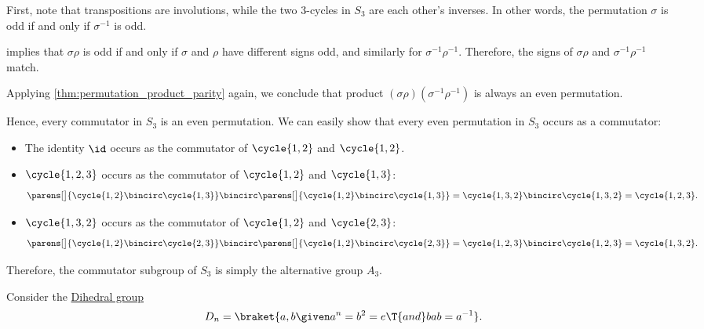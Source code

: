 \begin{example}
\begin{thmenum}
    First, note that transpositions are involutions, while the two \( 3 \)-cycles in \( S_3 \) are each other's inverses. In other words, the permutation \( \sigma \) is odd if and only if \( \sigma^{-1} \) is odd.

     implies that \( \sigma \rho \) is odd if and only if \( \sigma \) and \( \rho \) have different signs odd, and similarly for \( \sigma^{-1} \rho^{-1} \). Therefore, the signs of \( \sigma \rho \) and \( \sigma^{-1} \rho^{-1} \) match.

    Applying \cref{thm:permutation_product_parity} again, we conclude that product \( (\sigma \rho) (\sigma^{-1} \rho^{-1}) \) is always an even permutation.

    Hence, every commutator in \( S_3 \) is an even permutation. We can easily show that every even permutation in \( S_3 \) occurs as a commutator:
    \begin{itemize}
      \item The identity \( \id \) occurs as the commutator of \( \cycle{ 1, 2 } \) and \( \cycle{ 1, 2 } \).
      \item \( \cycle{ 1, 2, 3 } \) occurs as the commutator of \( \cycle{ 1, 2 } \) and \( \cycle{ 1, 3 } \):
      \begin{equation*}
        \parens[\big]{ \cycle{ 1, 2 } \bincirc \cycle{ 1, 3 } } \bincirc \parens[\big]{ \cycle{ 1, 2 } \bincirc \cycle{ 1, 3 } }
        =
        \cycle{ 1, 3, 2 } \bincirc \cycle{ 1, 3, 2 }
        =
        \cycle{ 1, 2, 3 }.
      \end{equation*}

      \item \( \cycle{ 1, 3, 2 } \) occurs as the commutator of \( \cycle{ 1, 2 } \) and \( \cycle{ 2, 3 } \):
      \begin{equation*}
        \parens[\big]{ \cycle{ 1, 2 } \bincirc \cycle{ 2, 3 } } \bincirc \parens[\big]{ \cycle{ 1, 2 } \bincirc \cycle{ 2, 3 } }
        =
        \cycle{ 1, 2, 3 } \bincirc \cycle{ 1, 2, 3 }
        =
        \cycle{ 1, 3, 2 }.
      \end{equation*}
    \end{itemize}

    Therefore, the commutator subgroup of \( S_3 \) is simply the alternative group \( A_3 \).

     Consider the \hyperref[def:dihedral_group]{Dihedral group}
    \begin{equation*}
      D_n = \braket{ a, b \given a^n = b^2 = e \T{and} bab = a^{-1} }.
    \end{equation*}


\end{thmenum}
\end{example}
